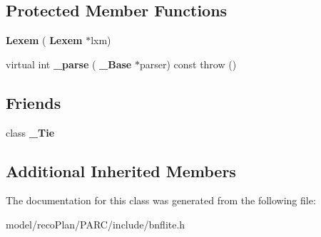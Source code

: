 \subsection*{Protected Member Functions}
\begin{DoxyCompactItemize}
\item 
\mbox{\label{classbnf_1_1_lexem_adc34732c5794c9dc0e7287b215d1aefb}} 
{\bfseries Lexem} (\textbf{ Lexem} $\ast$lxm)
\item 
\mbox{\label{classbnf_1_1_lexem_ad8d44651fcf8e326d3064f76392fa4fd}} 
virtual int {\bfseries \+\_\+parse} (\textbf{ \+\_\+\+Base} $\ast$parser) const  throw ()
\end{DoxyCompactItemize}
\subsection*{Friends}
\begin{DoxyCompactItemize}
\item 
\mbox{\label{classbnf_1_1_lexem_ab555bd08f573aad86ad95feb76007c15}} 
class {\bfseries \+\_\+\+Tie}
\end{DoxyCompactItemize}
\subsection*{Additional Inherited Members}


The documentation for this class was generated from the following file\+:\begin{DoxyCompactItemize}
\item 
model/reco\+Plan/\+P\+A\+R\+C/include/bnflite.\+h\end{DoxyCompactItemize}
